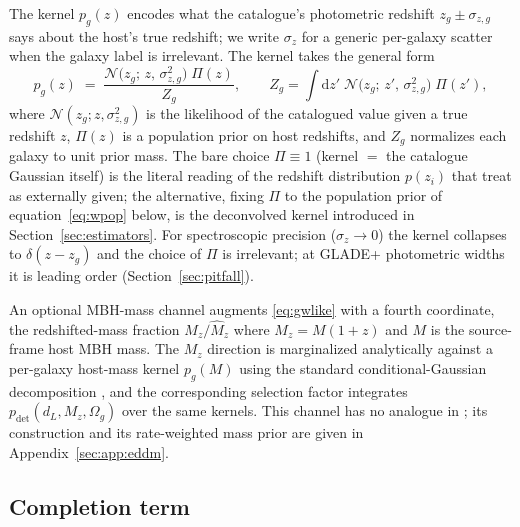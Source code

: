 The kernel $p_g(z)$ encodes what the catalogue's photometric redshift
$z_g \pm \sigma_{z,g}$ says about the host's true redshift; we write
$\sigma_z$ for a generic per-galaxy scatter when the galaxy label is
irrelevant.  The kernel takes the general form
\begin{equation}
  p_g(z) \;=\;
  \frac{\mathcal{N}\big(z_g;\, z,\, \sigma_{z,g}^2\big)\;\Pi(z)}{Z_g},
  \qquad
  Z_g = \int \mathrm{d}z'\;
  \mathcal{N}\big(z_g;\, z',\, \sigma_{z,g}^2\big)\;\Pi(z'),
  \label{eq:kernel}
\end{equation}
where $\mathcal{N}(z_g; z, \sigma_{z,g}^2)$ is the likelihood of the
catalogued value given a true redshift $z$, $\Pi(z)$ is a population
prior on host redshifts, and $Z_g$ normalizes each galaxy to unit
prior mass.  The bare choice $\Pi \equiv 1$ (kernel $=$ the catalogue
Gaussian itself) is the literal reading of the redshift distribution
$p(z_i)$ that \citet{Gray:2019ksv} treat as externally given; the
alternative, fixing $\Pi$ to the population prior of
equation~\eqref{eq:wpop} below, is the deconvolved kernel introduced
in Section~\ref{sec:estimators}.  For spectroscopic precision
($\sigma_z \to 0$) the kernel collapses to $\delta(z - z_g)$ and the
choice of $\Pi$ is irrelevant; at GLADE+ photometric widths it is
leading order (Section~\ref{sec:pitfall}).

An optional MBH-mass channel augments \eqref{eq:gwlike} with a fourth
coordinate, the redshifted-mass fraction $M_z/\hat M_z$ where
$M_z = M(1+z)$ and $M$ is the source-frame host MBH mass.  The
$M_z$ direction is marginalized analytically against a per-galaxy
host-mass kernel $p_g(M)$ using the standard conditional-Gaussian
decomposition \citep{Bishop2006},
and the corresponding selection factor integrates
$p_\mathrm{det}(d_L, M_z, \Omega_g)$ over the same kernels.  This
channel has no analogue in \citet{Gray:2019ksv}; its construction and
its rate-weighted mass prior are given in
Appendix~\ref{sec:app:eddm}.

\subsection{Completion term}
\label{sec:framework:completion}

